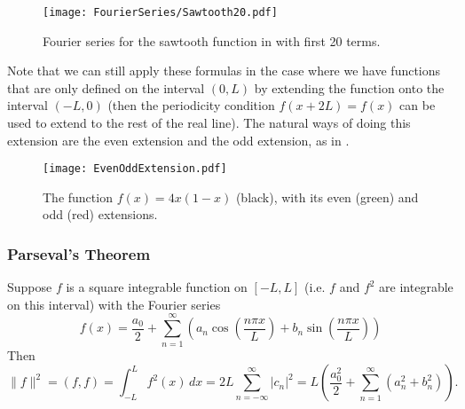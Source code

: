 \begin{figure}[!ht]
	\centering
	\texttt{[image: FourierSeries/Sawtooth20.pdf]}
	\caption{Fourier series for the sawtooth function in  with first 20 terms.}
	\label{fig:fouriersawtooth}
\end{figure}

Note that we can still apply these formulas in the case where we have functions that are only defined on the interval $(0,L)$ by extending the function onto the interval $(-L,0)$ (then the periodicity condition $f(x+2L)=f(x)$ can be used to extend to the rest of the real line). The natural ways of doing this extension are the even extension and the odd extension, as in .

\begin{figure}[!ht]
	\centering
	\texttt{[image: EvenOddExtension.pdf]}
	\caption{The function $f(x) = 4x(1-x)$ (black), with its even (green) and odd (red) extensions.}
	\label{fig:evenoddextension}
\end{figure}

\subsubsection{Parseval's Theorem}

\begin{theorem}\label{thrm:parseval}
	Suppose $f$ is a square integrable function on $[-L,L]$ (i.e. $f$ and $f^2$ are integrable on this interval) with the Fourier series
	\[
	f(x) = \frac{a_0}{2} + \sum_{n=1}^{\infty} \left(a_n \cos{\left(\frac{n\pi x}{L}\right)} + b_n \sin{\left(\frac{n\pi x}{L}\right)}\right)
	\]
	Then
	\[
	\lVert f\rVert^2 = (f,f) = \int_{-L}^L f^2(x) \,dx = 2L\sum_{n=-\infty}^{\infty} |c_n|^2 = L\left(\frac{a_0^2}{2} + \sum_{n=1}^{\infty}(a_n^2 + b_n^2)\right).
	\]
\end{theorem}


